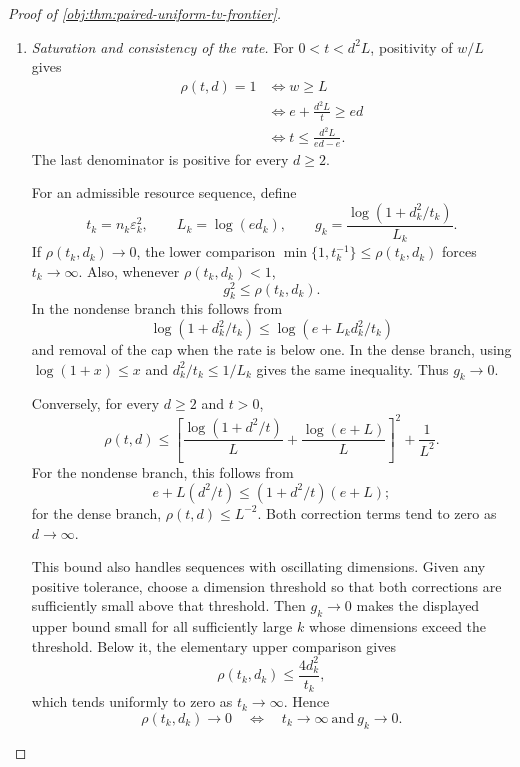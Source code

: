 \begin{proof}[Proof of \cref{obj:thm:paired-uniform-tv-frontier}]
\begin{enumerate}
The protocol inclusion in \cref{obj:def:tv-private-decision-values} gives
\[
\mathfrak R^{\mathrm{TV}}_{\mathrm{SI}}
(\mathcal P_d^{\mathrm{pair}};n,d,\varepsilon)
\le
\mathfrak R^{\mathrm{TV}}_{\mathrm{NI}}
(\mathcal P_d^{\mathrm{pair}};n,d,\varepsilon),
\]
and the corresponding inequality for honest length.
The common bounds make all four values finite and strictly positive.
For risk, they also give
\[
\mathfrak R^{\mathrm{TV}}_{\mathrm{NI}}
(\mathcal P_d^{\mathrm{pair}};n,d,\varepsilon)
\le C_0\rho(t,d)
=\frac{C_0}{c}\,c\rho(t,d)
\le\frac{C_0}{c}
\mathfrak R^{\mathrm{TV}}_{\mathrm{SI}}
(\mathcal P_d^{\mathrm{pair}};n,d,\varepsilon).
\]
Dividing by the positive SI value yields the asserted risk ratio bounds.
Replacing \(\rho(t,d)\) by \(\sqrt{\rho(t,d)}\) proves the same ratio bounds for honest length.

\item \textit{Saturation and consistency of the rate.}
For \(0<t<d^2L\), positivity of \(w/L\) gives
\[
\begin{aligned}
\rho(t,d)=1
&\Longleftrightarrow w\ge L\\
&\Longleftrightarrow e+\frac{d^2L}{t}\ge ed\\
&\Longleftrightarrow
t\le\frac{d^2L}{ed-e}.
\end{aligned}
\]
The last denominator is positive for every \(d\ge2\).

For an admissible resource sequence, define
\[
t_k=n_k\varepsilon_k^2,\qquad
L_k=\log(ed_k),\qquad
g_k=\frac{\log(1+d_k^2/t_k)}{L_k}.
\]
If \(\rho(t_k,d_k)\to0\), the lower comparison
\(\min\{1,t_k^{-1}\}\le\rho(t_k,d_k)\) forces \(t_k\to\infty\).
Also, whenever \(\rho(t_k,d_k)<1\),
\[
g_k^2\le\rho(t_k,d_k).
\]
In the nondense branch this follows from
\[
\log(1+d_k^2/t_k)
\le\log(e+L_kd_k^2/t_k)
\]
and removal of the cap when the rate is below one.
In the dense branch, using \(\log(1+x)\le x\) and
\(d_k^2/t_k\le1/L_k\) gives the same inequality.
Thus \(g_k\to0\).

Conversely, for every \(d\ge2\) and \(t>0\),
\[
\rho(t,d)\le
\left[
\frac{\log(1+d^2/t)}{L}
+\frac{\log(e+L)}{L}
\right]^2+\frac1{L^2}.
\]
For the nondense branch, this follows from
\[
e+L(d^2/t)\le(1+d^2/t)(e+L);
\]
for the dense branch, \(\rho(t,d)\le L^{-2}\).
Both correction terms tend to zero as \(d\to\infty\).

This bound also handles sequences with oscillating dimensions.
Given any positive tolerance, choose a dimension threshold so that both corrections are sufficiently small above that threshold.
Then \(g_k\to0\) makes the displayed upper bound small for all sufficiently large \(k\) whose dimensions exceed the threshold.
Below it, the elementary upper comparison gives
\[
\rho(t_k,d_k)\le\frac{4d_k^2}{t_k},
\]
which tends uniformly to zero as \(t_k\to\infty\).
Hence
\[
\rho(t_k,d_k)\to0
\quad\Longleftrightarrow\quad
t_k\to\infty\ \text{and}\ g_k\to0.
\]


\end{enumerate}
\end{proof}

